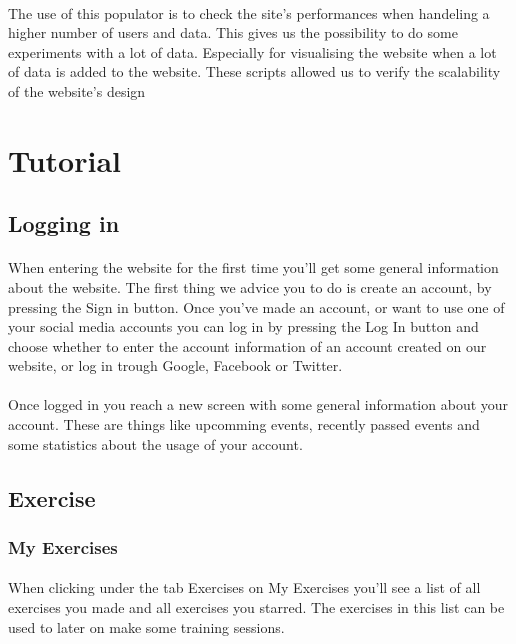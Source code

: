 \documentclass[11pt,a4paper]{scrartcl}
\begin{document}
\paragraph{}The use of this populator is to check the site's performances when handeling a higher number of users and data. This gives us the possibility to do some experiments with a lot of data. Especially for visualising the website when a lot of data is added to the website. These scripts allowed us to verify the scalability of the website's design
\section{Tutorial}
\subsection{Logging in}
\paragraph{}When entering the website for the first time you'll get some general information about the website. The first thing we advice you to do is create an account, by pressing the Sign in button. Once you've made an account, or want to use one of your social media accounts you can log in by pressing the Log In button and choose whether to enter the account information of an account created on our website, or log in trough Google, Facebook or Twitter.
\paragraph{}Once logged in you reach a new screen with some general information about your account. These are things like upcomming events, recently passed events and some statistics about the usage of your account.

\subsection{Exercise}
\subsubsection{My Exercises}
\paragraph{}When clicking under the tab Exercises on My Exercises you'll see a list of all exercises you made and all exercises you starred. The exercises in this list can be used to later on make some training sessions.
\end{document}
